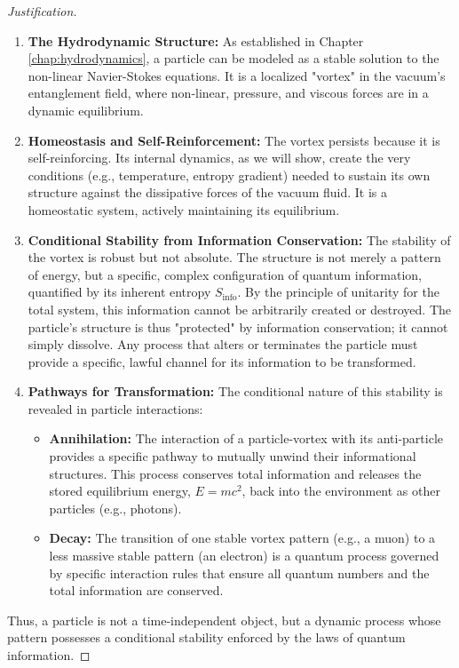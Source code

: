 \documentclass[11pt, letterpaper]{report}
\theoremstyle{plain} %
\theoremstyle{definition} %
\theoremstyle{remark} %
\begin{document}
\begin{proof}[Justification]
\begin{enumerate}
    \item \textbf{The Hydrodynamic Structure:} As established in Chapter \ref{chap:hydrodynamics}, a particle can be modeled as a stable solution to the non-linear Navier-Stokes equations. It is a localized "vortex" in the vacuum's entanglement field, where non-linear, pressure, and viscous forces are in a dynamic equilibrium.

    \item \textbf{Homeostasis and Self-Reinforcement:} The vortex persists because it is self-reinforcing. Its internal dynamics, as we will show, create the very conditions (e.g., temperature, entropy gradient) needed to sustain its own structure against the dissipative forces of the vacuum fluid. It is a homeostatic system, actively maintaining its equilibrium.

    \item \textbf{Conditional Stability from Information Conservation:} The stability of the vortex is robust but not absolute. The structure is not merely a pattern of energy, but a specific, complex configuration of quantum information, quantified by its inherent entropy $S_{\text{info}}$. By the principle of unitarity for the total system, this information cannot be arbitrarily created or destroyed. The particle's structure is thus "protected" by information conservation; it cannot simply dissolve. Any process that alters or terminates the particle must provide a specific, lawful channel for its information to be transformed.

    \item \textbf{Pathways for Transformation:} The conditional nature of this stability is revealed in particle interactions:
        \begin{itemize}
            \item \textbf{Annihilation:} The interaction of a particle-vortex with its anti-particle provides a specific pathway to mutually unwind their informational structures. This process conserves total information and releases the stored equilibrium energy, $E=mc^2$, back into the environment as other particles (e.g., photons).
            \item \textbf{Decay:} The transition of one stable vortex pattern (e.g., a muon) to a less massive stable pattern (an electron) is a quantum process governed by specific interaction rules that ensure all quantum numbers and the total information are conserved.
        \end{itemize}
\end{enumerate}
Thus, a particle is not a time-independent object, but a dynamic process whose pattern possesses a conditional stability enforced by the laws of quantum information.
\end{proof}
\end{document}
